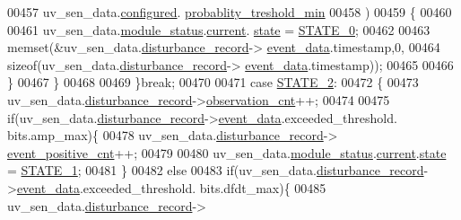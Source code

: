 \begin{DoxyCode}
00457                            uv\_sen\_data.\hyperlink{a00035_a94b2d1f6ea4ab334c74d24984dd27843}{configured}.
      \hyperlink{a00021_aa59261f74183d4f9e909ac425e0bea35}{probablity\_treshold\_min}
00458                            )
00459                          \{
00460 
00461                              uv\_sen\_data.\hyperlink{a00035_a5a53c391562b059eb744ac679f3765ca}{module\_status}.\hyperlink{a00017_ab8af48cdbba92b3ae39c4470e53af944}{current}.
      \hyperlink{a00017_a6b8d8e916bc56265a3fd279bd26b6d1b}{state} = \hyperlink{a00021_ad6739dbbe5581cac99b7dc8a5e09949c}{STATE\_0};
00462 
00463                              memset(&uv\_sen\_data.\hyperlink{a00035_ac9b38e2c1d3f1013a88d33506c754152}{disturbance\_record}->
      \hyperlink{a00028_a8c0bda69e71ef674e60da47ad0be9ab0}{event\_data}.timestamp,0,
00464                                      \textcolor{keyword}{sizeof}(uv\_sen\_data.\hyperlink{a00035_ac9b38e2c1d3f1013a88d33506c754152}{disturbance\_record}->
      \hyperlink{a00028_a8c0bda69e71ef674e60da47ad0be9ab0}{event\_data}.timestamp));
00465 
00466                         \}
00467              \}
00468 
00469         \}\textcolor{keywordflow}{break};
00470 
00471          \textcolor{keywordflow}{case} \hyperlink{a00021_a66fa48e832a64af4d405511cecc4c752}{STATE\_2}: 
00472         \{
00473             uv\_sen\_data.\hyperlink{a00035_ac9b38e2c1d3f1013a88d33506c754152}{disturbance\_record}->\hyperlink{a00028_ad5b0bac02ce266b91b2b52a1c3ea1d78}{observation\_cnt}++;
00474 
00475             \textcolor{keywordflow}{if}(uv\_sen\_data.\hyperlink{a00035_ac9b38e2c1d3f1013a88d33506c754152}{disturbance\_record}->\hyperlink{a00028_a8c0bda69e71ef674e60da47ad0be9ab0}{event\_data}.exceeded\_threshold.
      bits.amp\_max)\{
00478                  uv\_sen\_data.\hyperlink{a00035_ac9b38e2c1d3f1013a88d33506c754152}{disturbance\_record}->
      \hyperlink{a00028_a7397b9d76d4b57500f27bb23d258a18a}{event\_positive\_cnt}++;
00479 
00480                  uv\_sen\_data.\hyperlink{a00035_a5a53c391562b059eb744ac679f3765ca}{module\_status}.\hyperlink{a00017_ab8af48cdbba92b3ae39c4470e53af944}{current}.\hyperlink{a00017_a6b8d8e916bc56265a3fd279bd26b6d1b}{state} = 
      \hyperlink{a00021_a727351838367f27ac0adb9a13422c342}{STATE\_1};
00481             \}
00482             \textcolor{keywordflow}{else}
00483              \textcolor{keywordflow}{if}(uv\_sen\_data.\hyperlink{a00035_ac9b38e2c1d3f1013a88d33506c754152}{disturbance\_record}->\hyperlink{a00028_a8c0bda69e71ef674e60da47ad0be9ab0}{event\_data}.exceeded\_threshold.
      bits.dfdt\_max)\{
00485                uv\_sen\_data.\hyperlink{a00035_ac9b38e2c1d3f1013a88d33506c754152}{disturbance\_record}->

\end{DoxyCode}
